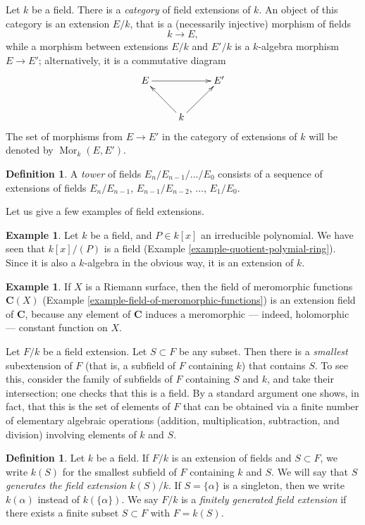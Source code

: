 \documentclass{stacks-project}
\theoremstyle{plain}
\theoremstyle{definition}
\newtheorem{definition}[subsection]{Definition}
\newtheorem{example}[subsection]{Example}
\theoremstyle{remark}
\numberwithin{equation}{subsection}
\def\Mor{\mathop{\mathrm{Mor}}\nolimits}
\begin{document}
\medskip\noindent
Let $k$ be a field. There is a {\it category} of field extensions of $k$.
An object of this category is an extension $E/k$, that is a
(necessarily injective) morphism of fields
$$
k \to E,
$$
while a morphism between extensions $E/k$ and $E'/k$ is a $k$-algebra
morphism $E \to E'$; alternatively, it is a commutative diagram
$$
\xymatrix{
E \ar[rr] & & E' \\
& k \ar[ru] \ar[lu] &
}
$$
The set of morphisms from $E \to E'$ in the category of extensions of $k$
will be denoted by $\Mor_k(E, E')$.

\begin{definition}
\label{definition-tower}
A {\it tower} of fields $E_n/E_{n - 1}/\ldots/E_0$ consists of a sequence of
extensions of fields
$E_n/E_{n - 1}$, $E_{n - 1}/E_{n - 2}$, $\ldots$, $E_1/E_0$.
\end{definition}

\noindent
Let us give a few examples of field extensions.

\begin{example}
\label{example-monogenic-extension}
Let $k$ be a field, and $P \in k[x]$ an irreducible polynomial. We have
seen that $k[x]/(P)$ is a field (Example \ref{example-quotient-polymial-ring}).
Since it is also a $k$-algebra in the obvious way, it is an extension of $k$.
\end{example}

\begin{example}
\label{example-field-of-meromorphic-functions-extension-C}
If $X$ is a Riemann surface, then the field of meromorphic functions
$\mathbf{C}(X)$ (Example \ref{example-field-of-meromorphic-functions})
is an extension field of $\mathbf{C}$, because any element of $\mathbf{C}$
induces a meromorphic --- indeed, holomorphic --- constant function on $X$.
\end{example}

\noindent
Let $F/k$ be a field extension. Let $S \subset F$ be any subset.
Then there is a {\it smallest} subextension of $F$ (that is, a subfield of
$F$ containing $k$) that contains $S$. To see this, consider the family of
subfields of $F $ containing $S$ and $k$, and take their intersection; one
checks that this is a field. By a standard argument one shows, in fact, that
this is the set of elements of $F$ that can be obtained via a finite number
of elementary algebraic operations (addition, multiplication, subtraction,
and division) involving elements of $k$ and $S$.

\begin{definition}
\label{definition-generated-by}
Let $k$ be a field. If $F/k$ is an extension of fields and
$S \subset F$, we write $k(S)$ for the smallest subfield of $F$
containing $k$ and $S$. We will say that $S$ {\it generates the
field extension} $k(S)/k$. If $S = \{\alpha\}$ is a singleton, then we
write $k(\alpha)$ instead of $k(\{\alpha\})$. We say $F/k$ is a
{\it finitely generated field extension} if there exists a
finite subset $S \subset F$ with $F = k(S)$.
\end{definition}
\end{document}
